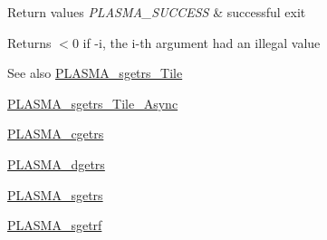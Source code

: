 \begin{DoxyRetVals}{Return values}
{\em P\+L\+A\+S\+M\+A\+\_\+\+S\+U\+C\+C\+E\+S\+S} & successful exit \\
\hline
\end{DoxyRetVals}
\begin{DoxyReturn}{Returns}
$<$0 if -\/i, the i-\/th argument had an illegal value
\end{DoxyReturn}
\begin{DoxySeeAlso}{See also}
\hyperlink{group__float__Tile_gadb6246bd33d383f96297ddafdbfc0599_gadb6246bd33d383f96297ddafdbfc0599}{P\+L\+A\+S\+M\+A\+\_\+sgetrs\+\_\+\+Tile} 

\hyperlink{group__float__Tile__Async_ga89f118911b8b996c80ab0ba9c2f7b369_ga89f118911b8b996c80ab0ba9c2f7b369}{P\+L\+A\+S\+M\+A\+\_\+sgetrs\+\_\+\+Tile\+\_\+\+Async} 

\hyperlink{group__PLASMA__Complex32__t_ga898ea98a3d182865980c7393dfca2c27_ga898ea98a3d182865980c7393dfca2c27}{P\+L\+A\+S\+M\+A\+\_\+cgetrs} 

\hyperlink{group__double_gaff3c22db4affbede58e22311320a2b85_gaff3c22db4affbede58e22311320a2b85}{P\+L\+A\+S\+M\+A\+\_\+dgetrs} 

\hyperlink{group__float_ga655cb742ac1c78e5ce86070f4ce1271b_ga655cb742ac1c78e5ce86070f4ce1271b}{P\+L\+A\+S\+M\+A\+\_\+sgetrs} 

\hyperlink{group__float_ga8bf6af99c20539f64fa60b64d99fc1be_ga8bf6af99c20539f64fa60b64d99fc1be}{P\+L\+A\+S\+M\+A\+\_\+sgetrf} 
\end{DoxySeeAlso}
\hypertarget{group__float_gae593ed2d7e164acc75c4e6efdca4d95a_gae593ed2d7e164acc75c4e6efdca4d95a}{}
